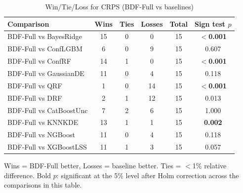 \begin{table}[htbp]
\centering
\caption{Win/Tie/Loss for CRPS (BDF-Full vs baselines)}
\label{tab:win-tie-loss}
\begin{tabular}{lccccc}
\toprule
Comparison & Wins & Ties & Losses & Total & Sign test $p$ \\
\midrule
BDF-Full vs BayesRidge & 15 & 0 & 0 & 15 & \textbf{$<$0.001} \\
BDF-Full vs ConfLGBM & 6 & 0 & 9 & 15 & 0.607 \\
BDF-Full vs ConfRF & 14 & 1 & 0 & 15 & \textbf{$<$0.001} \\
BDF-Full vs GaussianDE & 11 & 0 & 4 & 15 & 0.118 \\
BDF-Full vs QRF & 1 & 0 & 14 & 15 & \textbf{$<$0.001} \\
BDF-Full vs DRF & 2 & 1 & 12 & 15 & 0.013 \\
BDF-Full vs CatBoostUnc & 7 & 2 & 6 & 15 & 1.000 \\
BDF-Full vs KNNKDE & 13 & 1 & 1 & 15 & \textbf{0.002} \\
BDF-Full vs NGBoost & 11 & 0 & 4 & 15 & 0.118 \\
BDF-Full vs XGBoostLSS & 11 & 1 & 3 & 15 & 0.057 \\
\bottomrule
\end{tabular}
\par\smallskip\footnotesize{Wins = BDF-Full better, Losses = baseline better. Ties = $<$1\% relative difference. Bold $p$: significant at the 5\% level after Holm correction across the comparisons in this table.}
\end{table}
